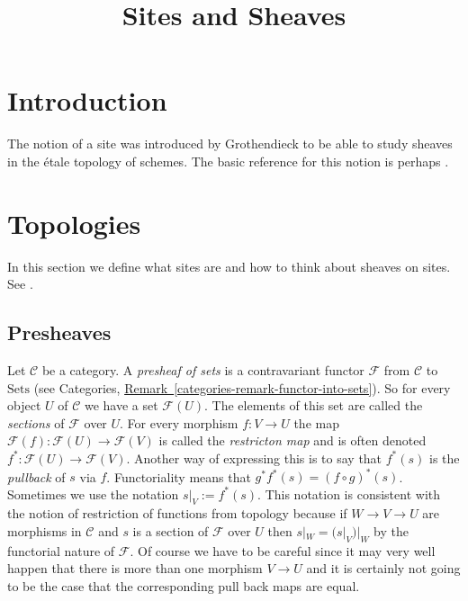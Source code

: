 

%


\title{Sites and Sheaves}


\maketitle

\tableofcontents

\section{Introduction}
\label{section-introduction}

\noindent
The notion of a site was introduced by Grothendieck to be able to study
sheaves in the \'etale topology of schemes. The basic reference for this
notion is perhaps \cite{SGA4}. 

\section{Topologies}
\label{section-topologies}

\noindent
In this section we define what sites are and how to think about sheaves
on sites. See \cite{ArtinTopologies}.

\subsection{Presheaves}
\label{subsection-presheaves}

\noindent
Let $\mathcal{C}$ be a category.
A {\it presheaf of sets} is a contravariant functor $\mathcal{F}$
from $\mathcal{C}$ to $\text{Sets}$ (see Categories, 
\hyperref[categories-remark-functor-into-sets]%
{Remark~\ref*{categories-remark-functor-into-sets}}). 
So for every object $U$ of $\mathcal{C}$ we have a set 
$\mathcal{F}(U)$. The elements of this set are called
the {\it sections} of $\mathcal{F}$ over $U$. For every morphism
$f : V \to U$ the map $\mathcal{F}(f) : \mathcal{F}(U) \to \mathcal{F}(V)$
is called the {\it restricton map} and is often denoted
$f^\ast : \mathcal{F}(U) \to \mathcal{F}(V)$. Another way
of expressing this is to say that $f^*(s)$ is the {\it pullback}
of $s$ via $f$. Functoriality means that $g^* f^* (s) = (f \circ g)^*(s)$.
Sometimes we use the notation $s|_V := f^\ast(s)$.
This notation is consistent with the notion of restriction
of functions from topology because if $W \to V \to U$
are morphisms in $\mathcal{C}$ and $s$ is a section of
$\mathcal{F}$ over $U$ then $s|_W = (s|_V)|_W$ by the
functorial nature of $\mathcal{F}$. Of course we have to be
careful since it may very well happen
that there is more than one morphism $V \to U$ and it is
certainly not going to be the case that the corresponding
pull back maps are equal.

